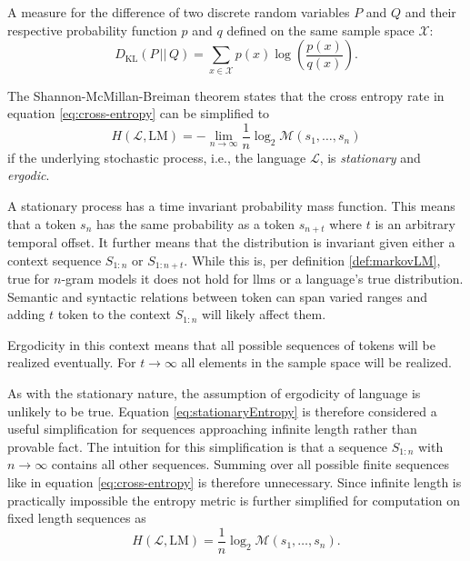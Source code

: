     \begin{definition}
    \label{def:kl}
        A measure for the difference of two discrete random variables $P$ and $Q$ and their respective probability function $p$ and $q$ defined on the same sample space $\mathcal{X}$:
        \begin{equation}
            D_{\mathrm{KL}}(P \, || \, Q) = \sum_{x \in \mathcal{X}} p(x) \log \left( \frac{p(x)}{q(x)} \right) \text{.}
        \end{equation}
    \end{definition}

    The Shannon-McMillan-Breiman theorem states that the cross entropy rate in equation \ref{eq:cross-entropy} can be simplified to
    \begin{equation}
    \label{eq:stationaryEntropy}
        H(\mathcal{L},\mathrm{LM}) = - \lim_{n \to \infty} \frac{1}{n} \log_2 \mathcal{M}(s_1, \dots, s_n)
    \end{equation}
    if the underlying stochastic process, i.e., the language $\mathcal{L}$, is \emph{stationary} and \emph{ergodic}.

    A stationary process has a time invariant probability mass function.
    This means that a token $s_n$ has the same probability as a token $s_{n+t}$ where $t$ is an arbitrary temporal offset.
    It further means that the distribution is invariant given either a context sequence $S_{1:n}$ or $S_{1:n+t}$.
    While this is, per definition \ref{def:markovLM}, true for $n$-gram models it does not hold for \acp{llm} or a language's true distribution.
    Semantic and syntactic relations between token can span varied ranges and adding $t$ token to the context $S_{1:n}$ will likely affect them.
    
    Ergodicity in this context means that all possible sequences of tokens will be realized eventually.
    For $t \to \infty$ all elements in the sample space will be realized.

    As with the stationary nature, the assumption of ergodicity of language is unlikely to be true.
    Equation \ref{eq:stationaryEntropy} is therefore considered a useful simplification for sequences approaching infinite length rather than provable fact.
    The intuition for this simplification is that a sequence $S_{1:n}$ with $n \to \infty$ contains all other sequences.
    Summing over all possible finite sequences like in equation \ref{eq:cross-entropy} is therefore unnecessary.
    Since infinite length is practically impossible the entropy metric is further simplified for computation on fixed length sequences as
    \begin{equation}
        H(\mathcal{L},\mathrm{LM}) = \frac{1}{n} \log_2 \mathcal{M}(s_1, \dots, s_n) \text{.}
    \end{equation} 

